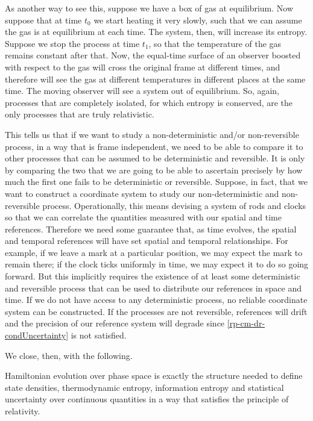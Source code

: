 As another way to see this, suppose we have a box of gas at equilibrium. Now suppose that at time $t_0$ we start heating it very slowly, such that we can assume the gas is at equilibrium at each time. The system, then, will increase its entropy. Suppose we stop the process at time $t_1$, so that the temperature of the gas remains constant after that. Now, the equal-time surface of an observer boosted with respect to the gas will cross the original frame at different times, and therefore will see the gas at different temperatures in different places at the same time. The moving observer will see a system out of equilibrium. So, again, processes that are completely isolated, for which entropy is conserved, are the only processes that are truly relativistic.

This tells us that if we want to study a non-deterministic and/or non-reversible process, in a way that is frame independent, we need to be able to compare it to other processes that can be assumed to be deterministic and reversible. It is only by comparing the two that we are going to be able to ascertain precisely by how much the first one fails to be deterministic or reversible. Suppose, in fact, that we want to construct a coordinate system to study our non-deterministic and non-reversible process. Operationally, this means devising a system of rods and clocks so that we can correlate the quantities measured with our spatial and time references. Therefore we need some guarantee that, as time evolves, the spatial and temporal references will have set spatial and temporal relationships. For example, if we leave a mark at a particular position, we may expect the mark to remain there; if the clock ticks uniformly in time, we may expect it to do so going forward. But this implicitly requires the existence of at least some deterministic and reversible process that can be used to distribute our references in space and time. If we do not have access to any deterministic process, no reliable coordinate system can be constructed. If the processes are not reversible, references will drift and the precision of our reference system will degrade since \ref{rp-cm-dr-condUncertainty} is not satisfied.

We close, then, with the following.
\begin{insight}
	Hamiltonian evolution over phase space is exactly the structure needed to define state densities, thermodynamic entropy, information entropy and statistical uncertainty over continuous quantities in a way that satisfies the principle of relativity.
\end{insight}

